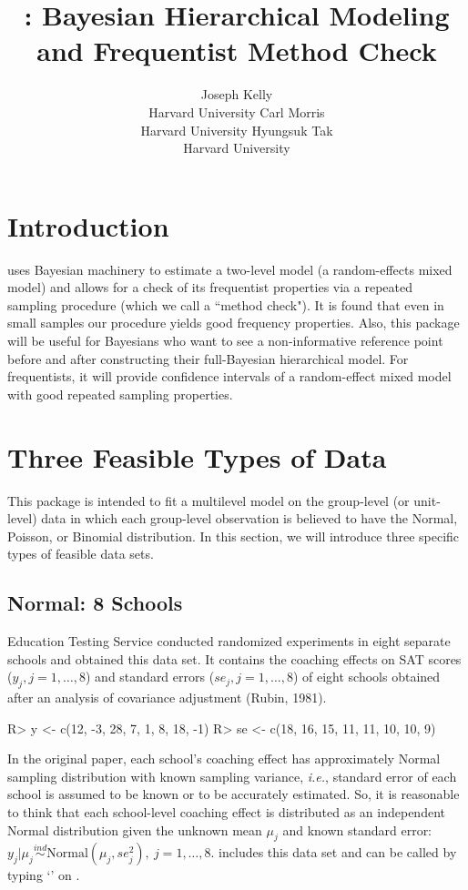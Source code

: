 \documentclass[article]{jss}
\author{Joseph Kelly\\Harvard University \And 
             Carl Morris\\ Harvard University\And
             Hyungsuk Tak\\Harvard University }
\title{\pkg{Rgbp}: Bayesian Hierarchical Modeling and Frequentist Method Check}
\begin{document}

\section[introduction]{Introduction}
 uses Bayesian machinery to estimate a two-level model (a random-effects mixed model) and allows for a check of its frequentist properties via a repeated sampling procedure (which we call a ``method check"). It is found that even in small samples our procedure yields good frequency properties. Also, this package will be useful for Bayesians who want to see a non-informative reference point before and after constructing their full-Bayesian hierarchical model. For frequentists, it will provide confidence intervals of a random-effect mixed model with good repeated sampling properties.

\section[Feasible Data Types]{Three Feasible Types of Data }
This package is intended to fit a multilevel model on the group-level (or unit-level) data in which each group-level observation is believed to have the Normal, Poisson, or Binomial distribution. In this section, we will introduce three specific types of feasible data sets.

\subsection{Normal: 8 Schools}
Education Testing Service conducted randomized experiments in eight separate schools and obtained this data set. It contains the coaching effects on SAT scores ($y_{j}, j=1, \ldots, 8$) and standard errors ($se_{j}, j=1, \ldots, 8$) of eight schools obtained after an analysis of covariance adjustment (Rubin, 1981).
\begin{CodeChunk}
\begin{CodeInput}
R> y  <- c(12, -3, 28,  7,  1,  8, 18, -1)
R> se <- c(18, 16, 15, 11, 11, 10, 10,  9)
\end{CodeInput}
\end{CodeChunk}

In the original paper, each school's coaching effect has approximately Normal sampling distribution with known sampling variance, \emph{i.e.}, standard error of each school is assumed to be known or to be accurately estimated. So, it is reasonable to think that each school-level coaching effect is distributed as an independent Normal distribution given the unknown mean $\mu_{j}$ and known standard error:  $y_{j}\vert\mu_{j}\stackrel{ind}{\sim} \textrm{Normal}(\mu_{j}, se^{2}_{j}),~ j=1, \ldots, 8$.  includes this data set and can be called by typing `' on .
\end{document}
